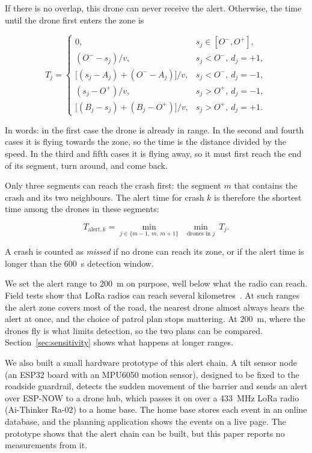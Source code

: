\documentclass[11pt]{article}
\begin{document}
If there is no overlap, this drone can never receive the alert. Otherwise, the
time until the drone first enters the zone is

\begin{equation}
T_j=
\begin{cases}
0, & s_j\in[O^-,O^+],\\[2pt]
(O^--s_j)/v, & s_j<O^-,\ d_j=+1,\\[2pt]
\big[(s_j-A_j)+(O^--A_j)\big]/v, & s_j<O^-,\ d_j=-1,\\[2pt]
(s_j-O^+)/v, & s_j>O^+,\ d_j=-1,\\[2pt]
\big[(B_j-s_j)+(B_j-O^+)\big]/v, & s_j>O^+,\ d_j=+1.
\end{cases}
\label{eq:cases}
\end{equation}

In words: in the first case the drone is already in range. In the second and
fourth cases it is flying towards the zone, so the time is the distance divided
by the speed. In the third and fifth cases it is flying away, so it must first
reach the end of its segment, turn around, and come back.

Only three segments can reach the crash first: the segment $m$ that contains
the crash and its two neighbours. The alert time for crash $k$ is therefore the
shortest time among the drones in these segments:

\begin{equation}
T_{\mathrm{alert},k}=\min_{j\in\{m-1,\,m,\,m+1\}}\ \ \min_{\text{drones in }j}\ T_j .
\label{eq:talert}
\end{equation}

A crash is counted as \emph{missed} if no drone can reach its zone, or if the
alert time is longer than the 600~s detection window.

We set the alert range to 200~m on purpose, well below what the radio can
reach. Field tests show that LoRa radios can reach several
kilometres~\cite{petajajarvi2015}. At such ranges the alert zone covers most of
the road, the nearest drone almost always hears the alert at once, and the
choice of patrol plan stops mattering. At 200~m, where the drones fly is what
limits detection, so the two plans can be compared.
Section~\ref{sec:sensitivity} shows what happens at longer ranges.

We also built a small hardware prototype of this alert chain. A tilt sensor
node (an ESP32 board with an MPU6050 motion sensor), designed to be fixed to
the roadside guardrail, detects the sudden movement of the barrier and sends an
alert over ESP-NOW to a drone hub, which passes it on over a 433~MHz LoRa radio
(Ai-Thinker Ra-02) to a home base. The home base stores each event in an online
database, and the planning application shows the events on a live page. The
prototype shows that the alert chain can be built, but this paper reports no
measurements from it.
\end{document}
